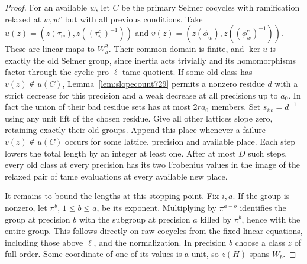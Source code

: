 \documentclass[a4paper,11pt]{article}
\theoremstyle{definition}
\theoremstyle{remark}
\numberwithin{equation}{section}
\begin{document}
\begin{proof}
For an available \(w\), let \(C\) be the primary Selmer cocycles with
ramification relaxed at \(w,w^c\) but with all previous conditions.
Take \(u(z)=(z(\tau_w),z((\tau_w^c)^{-1}))\) and
\(v(z)=(z(\phi_w),z((\phi_w^c)^{-1}))\). These are linear maps to
\(W_a^2\). Their common domain is finite, and \(\ker u\) is exactly
the old Selmer group, since inertia acts trivially and its homomorphisms
factor through the cyclic pro-\(\ell\) tame quotient. If some old
class has \(v(z)\notin u(C)\), Lemma~\ref{lem:slopecount729} permits
a nonzero residue \(d\) with a strict decrease for this precision
and a weak decrease at all precisions up to \(a_0\). In fact the
union of their bad residue sets has at most \(2r a_0\) members.
Set \(s_{iw}=d^{-1}\) using any unit lift of the chosen residue.
Give all other lattices slope zero, retaining exactly their old
groups. Append this place whenever a failure \(v(z)\notin u(C)\)
occurs for some lattice, precision and available place. Each step
lowers the total length by an integer at least one. After at most
\(D\) such steps, every old class at every precision has its two
Frobenius values in the image of the relaxed pair of tame evaluations
at every available new place.

It remains to bound the lengths at this stopping point. Fix \(i,a\).
If the group is nonzero, let \(\pi^b\), \(1\le b\le a\), be its
exponent. Multiplying by \(\pi^{a-b}\) identifies the group at
precision \(b\) with the subgroup at precision \(a\) killed by
\(\pi^b\), hence with the entire group. This follows directly on raw
cocycles from the fixed linear equations, including those above
\(\ell\), and the normalization. In precision \(b\) choose a class
\(z\) of full order. Some coordinate of one of its values is a unit,
so \(z(H)\) spans \(W_b\).


\end{proof}
\end{document}
